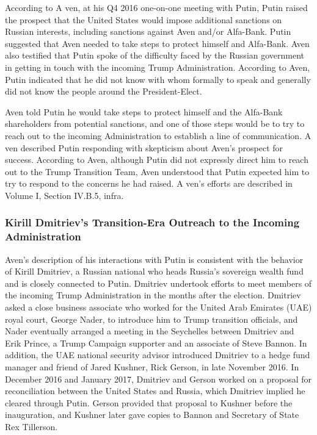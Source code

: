 According to A ven, at his Q4 2016 one-on-one meeting with Putin,%
Putin raised the prospect that the United States would impose additional sanctions on Russian interests, including sanctions against Aven and/or Alfa-Bank.%
Putin suggested that Aven needed to take steps to protect himself and Alfa-Bank.%
Aven also testified that Putin spoke of the difficulty faced by the Russian government in getting in touch with the incoming Trump Administration.%
According to Aven, Putin indicated that he did not know with whom formally to speak and generally did not know the people around the President-Elect.%

Aven told Putin he would take steps to protect himself and the Alfa-Bank shareholders from potential sanctions, and one of those steps would be to try to reach out to the incoming Administration to establish a line of communication.%
A ven described Putin responding with skepticism about Aven's prospect for success.%
According to Aven, although Putin did not expressly direct him to reach out to the Trump Transition Team, Aven understood that Putin expected him to try to respond to the concerns he had raised. %
A ven's efforts are described in Volume I, Section IV.B.5, infra.

\subsubsection{Kirill Dmitriev's Transition-Era Outreach to the Incoming Administration}

Aven's description of his interactions with Putin is consistent with the behavior of Kirill Dmitriev, a Russian national who heads Russia's sovereign wealth fund and is closely connected to Putin. Dmitriev undertook efforts to meet members of the incoming Trump Administration in the months after the election. Dmitriev asked a close business associate who worked for the United Arab Emirates (UAE) royal court, George Nader, to introduce him to Trump transition officials, and Nader eventually arranged a meeting in the Seychelles between Dmitriev and Erik Prince, a Trump Campaign supporter and an associate of Steve Bannon.%
In addition, the UAE national security advisor introduced Dmitriev to a hedge fund manager and friend of Jared Kushner, Rick Gerson, in late November 2016. In December 2016 and January 2017, Dmitriev and Gerson worked on a proposal for reconciliation between the United States and Russia, which Dmitriev implied he cleared through Putin. Gerson provided that proposal to Kushner before the inauguration, and Kushner later gave copies to Bannon and Secretary of State Rex Tillerson.

